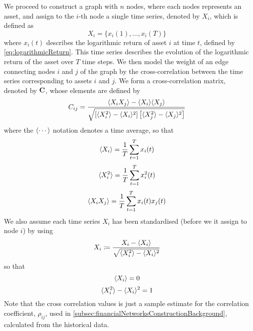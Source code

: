We proceed to construct a graph with $n$ nodes, where each nodes represents an asset, and assign to the $i$-th node a single time series, denoted by $X_{i}$, which is defined as
\begin{equation}
	\label{eq:singleTimeSeries}
	X_{i} = \{x_{i}(1),\dots,x_{i}(T)\}
\end{equation}
where $x_{i}(t)$ describes the logarithmic return of asset $i$ at time $t$, defined by \cref{eq:logarithmicReturn}.
This time series describes the evolution of the logarithmic return of the asset over $T$ time steps.
We then model the weight of an edge connecting nodes $i$ and $j$ of the graph by the cross-correlation between the time series corresponding to assets $i$ and $j$.
We form a cross-correlation matrix, denoted by $\mathbf C$, whose elements are defined by
\begin{equation}
	\label{eq:crossCorrelationMatrix}
	C_{ij} = \frac{\langle X_{i} X_{j}\rangle - \langle X_{i}\rangle \langle X_{j}\rangle}{\sqrt{\left[ \langle X_{i}^{2}\rangle - \langle X_{i}\rangle^{2} \right] \left[ \langle X_{j}^{2}\rangle - \langle X_{j}\rangle^{2} \right]}}
\end{equation}
where the $\langle\cdots\rangle$ notation denotes a time average, so that
\begin{equation}
	\label{eq:temporalMean}
	\langle X_{i}\rangle = \frac{1}{T} \sum_{t=1}^{T} x_{i}(t)
\end{equation}
\begin{equation}
	\label{eq:temporalMeanSquare}
	\langle X_{i}^{2}\rangle = \frac{1}{T} \sum_{t=1}^{T} x_{i}^{2}(t)
\end{equation}
\begin{equation}
	\label{eq:temporalMeanProduct}
	\langle X_{i}X_{j}\rangle = \frac{1}{T} \sum_{t=1}^{T} x_{i}(t)x_{j}(t)
\end{equation}
We also assume each time series $X_{i}$ has been standardised (before we it assign to node $i$) by using
\begin{equation}
	\label{eq:standardiseTimeSeries}
	X_{i} \coloneqq \frac{X_{i} - \langle X_{i}\rangle}{\sqrt{\langle X_{i}^{2}\rangle - \langle X_{i}\rangle^{2}}}
\end{equation}
so that
\begin{equation}
	\label{eq:zeroTemporalMean}
	\langle X_{i}\rangle = 0
\end{equation}
\begin{equation}
	\label{eq:unitTemporalVariance}
	\langle X_{i}^{2}\rangle - \langle X_{i}\rangle^{2} = 1
\end{equation}
Note that the cross correlation values is just a sample estimate for the correlation coefficient, $\rho_{ij}$, used in \cref{subsec:financialNetworksConstructionBackground}, calculated from the historical data.

